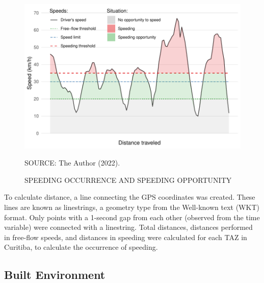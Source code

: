 
\begin{figure}[!htbp]
    \centering\footnotesize
    \captionsetup{font=footnotesize}
    \caption{SPEEDING OCCURRENCE AND SPEEDING OPPORTUNITY}
    \includegraphics{fig/spd_occur.pdf}
    \label{fig:spd_occur}
    \par SOURCE: The Author (2022).
\end{figure}


To calculate distance, a line connecting the GPS coordinates was created. These lines are known as linestrings, a geometry type from the Well-known text (WKT) format. Only points with a 1-second gap from each other (observed from the time variable) were connected with a linestring. Total distances, distances performed in free-flow speeds, and distances in speeding were calculated for each TAZ in Curitiba, to calculate the occurrence of speeding. 

\subsection{Built Environment} \label{sub:be}




